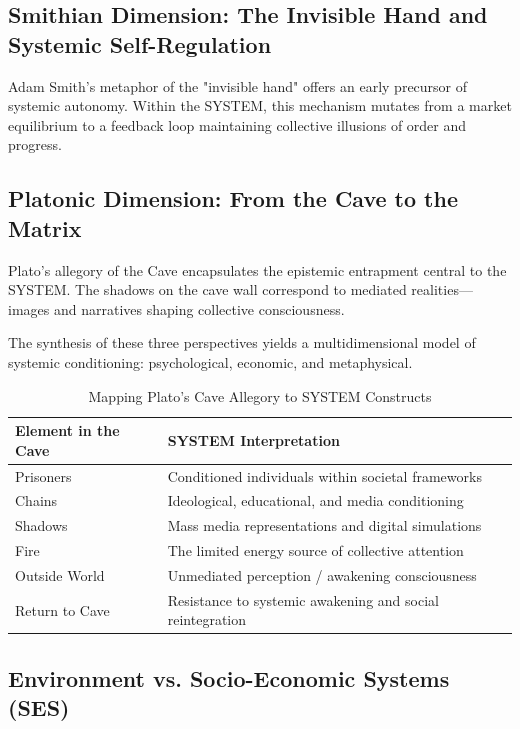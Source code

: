 \documentclass[11pt,a4paper]{article}
\theoremstyle{definition}
\theoremstyle{remark}
\begin{document}
\subsection{Smithian Dimension: The Invisible Hand and Systemic Self-Regulation}
Adam Smith’s metaphor of the "invisible hand" offers an early precursor of systemic autonomy. Within the SYSTEM, this mechanism mutates from a market equilibrium to a feedback loop maintaining collective illusions of order and progress.

\subsection{Platonic Dimension: From the Cave to the Matrix}
Plato’s allegory of the Cave encapsulates the epistemic entrapment central to the SYSTEM. The shadows on the cave wall correspond to mediated realities—images and narratives shaping collective consciousness.

The synthesis of these three perspectives yields a multidimensional model of systemic conditioning: psychological, economic, and metaphysical.

\begin{table}[h]
\centering
\caption{Mapping Plato’s Cave Allegory to SYSTEM Constructs}
\label{tab:plato_mapping}
\begin{tabular}{|l|l|}
\hline
\textbf{Element in the Cave} & \textbf{SYSTEM Interpretation} \\ \hline
Prisoners & Conditioned individuals within societal frameworks \\ \hline
Chains & Ideological, educational, and media conditioning \\ \hline
Shadows & Mass media representations and digital simulations \\ \hline
Fire & The limited energy source of collective attention \\ \hline
Outside World & Unmediated perception / awakening consciousness \\ \hline
Return to Cave & Resistance to systemic awakening and social reintegration \\ \hline
\end{tabular}
\end{table}

\subsection{Environment vs. Socio-Economic Systems (SES)}
\label{subsec:env_vs_ses}
\end{document}
